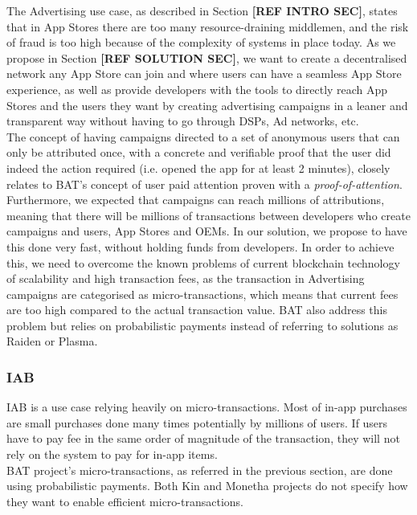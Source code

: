 The Advertising use case, as described in Section \textbf{[REF INTRO SEC]}, states that in App Stores there are too many resource-draining middlemen, and the risk of fraud is too high because of the complexity of systems in place today. As we propose in Section \textbf{[REF SOLUTION SEC]}, we want to create a decentralised network any App Store can join and where users can have a seamless App Store experience, as well as provide developers with the tools to directly reach App Stores and the users they want by creating advertising campaigns in a leaner and transparent way without having to go through DSPs, Ad networks, etc. \\

The concept of having campaigns directed to a set of anonymous users that can only be attributed once, with a concrete and verifiable proof that the user did indeed the action required (i.e. opened the app for at least 2 minutes), closely relates to BAT's concept of user paid attention proven with a \textit{proof-of-attention}. \\

Furthermore, we expected that campaigns can reach millions of attributions, meaning that there will be millions of transactions between developers who create campaigns and users, App Stores and OEMs. In our solution, we propose to have this done very fast, without holding funds from developers. In order to achieve this, we need to overcome the known problems of current blockchain technology of scalability and high transaction fees, as the transaction in Advertising campaigns are categorised as micro-transactions, which means that current fees are too high compared to the actual transaction value. BAT also address this problem but relies on probabilistic payments \cite{MICROPAY1, MICROPAY2} instead of referring to solutions as Raiden or Plasma.

\subsubsection{IAB}

IAB is a use case relying heavily on micro-transactions. Most of in-app purchases are small purchases done many times potentially by millions of users. If users have to pay fee in the same order of magnitude of the transaction, they will not rely on the system to pay for in-app items.\\

BAT project's micro-transactions, as referred in the previous section, are done using probabilistic payments. Both Kin and Monetha projects do not specify how they want to enable efficient micro-transactions. \\

